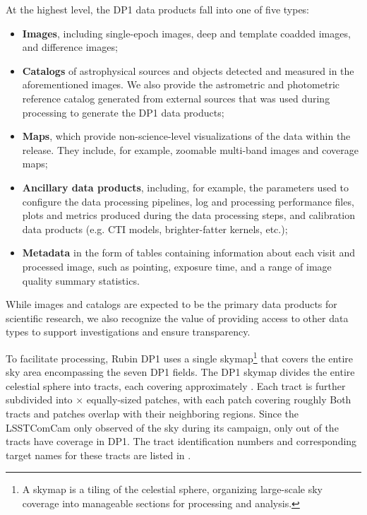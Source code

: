 At the highest level, the \gls{DP1} data products fall into one of five types:
\begin{itemize}
\item \textbf{Images}, including single-\gls{epoch} images, deep and template coadded images, and difference images;
\item \textbf{Catalogs} of astrophysical sources and objects detected and measured in the aforementioned images. We also provide the astrometric and photometric reference catalog generated from external sources that was used during processing to generate the \gls{DP1} data products;
\item \textbf{Maps}, which provide non-science-level visualizations of the data within the release. They include, for example, zoomable multi-band images and coverage maps;
\item \textbf{Ancillary data products}, including, for example, the parameters used to configure the data processing pipelines, log and processing performance files, plots and metrics produced during the data processing steps, and \gls{calibration} data products (e.g. \gls{CTI} models, brighter-fatter kernels, etc.);
\item \textbf{Metadata} in the form of tables containing information about each visit and processed image, such as pointing, exposure time, and a range of image quality summary statistics.
\end{itemize}
While images and catalogs are expected to be the primary data products for scientific research, we also recognize the value of providing access to other data types to support investigations and ensure transparency.

To facilitate processing, Rubin \gls{DP1} uses a single skymap\footnote{A skymap is a tiling of the celestial sphere, organizing large-scale sky coverage into manageable sections for processing and analysis.} that covers the entire sky area encompassing the seven \gls{DP1} fields.
The \gls{DP1} skymap divides the entire celestial sphere into \ntotaltracts tracts, each covering approximately \tractarea.
Each \gls{tract} is further subdivided into \npatchx × \npatchy equally-sized patches, with each \gls{patch} covering roughly \innerpatcharea
Both tracts and patches overlap with their neighboring regions.
Since the \gls{LSSTComCam} only observed \totalarea of the sky during its campaign, only \ncoveredtracts out of the \ntotaltracts tracts have coverage in \gls{DP1}.
The \gls{tract} identification numbers and corresponding target names for these tracts are listed in .


